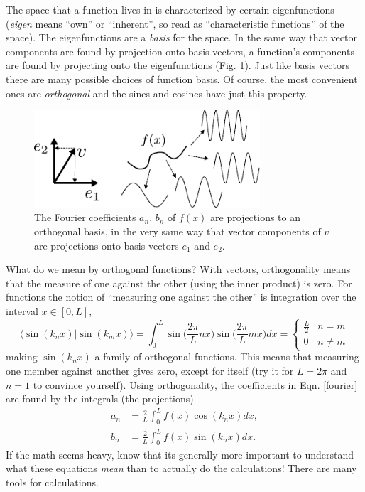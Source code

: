\documentclass[12pt]{article}
\begin{document}
The space that a function lives in is characterized by certain eigenfunctions (\textit{eigen} means ``own'' or ``inherent'', so read as ``characteristic functions'' of the space). The eigenfunctions are a \textit{basis} for the space. In the same way that vector components are found by projection onto basis vectors, a function's components are found by projecting onto the eigenfunctions (Fig. \ref{proj}). Just like basis vectors there are many possible choices of function basis. Of course, the most convenient ones are \textit{orthogonal} and the sines and cosines have just this property.
\begin{figure}[h]
  \centering
  \includegraphics[width=0.75\textwidth]{Fourier/fourier_projection}
  \caption{The Fourier coefficients $a_n$, $b_n$ of $f(x)$ are projections to an orthogonal basis, in the very same way that vector components of $v$ are projections onto basis vectors $e_1$ and $e_2$.}\label{proj}
\end{figure}

What do we mean by orthogonal functions? With vectors, orthogonality means that the measure of one against the other (using the inner product) is zero. For functions the notion of ``measuring one against the other'' is integration over the interval $x\in [0,L]$,
\begin{equation}
  \langle \sin(k_nx)|\sin(k_mx)\rangle = \int_0^L \sin\Big(\frac{2\pi}{L}nx\Big)\sin\Big(\frac{2\pi}{L}mx\Big)dx = \begin{cases} \frac{L}{2} & n=m\\
    0 & n\neq m\end{cases}
\end{equation}
making $\sin(k_nx)$ a family of orthogonal functions. This means that measuring one member against another gives zero, except for itself (try it for $L = 2\pi$ and $n=1$ to convince yourself). Using orthogonality, the coefficients in Eqn. \ref{fourier} are found by the integrals (the projections)
\begin{align}
  a_n &= \frac{2}{L}\int_0^L f(x)\cos(k_nx)dx,\label{f1}\\
  b_n &= \frac{2}{L}\int_0^L f(x)\sin(k_nx)dx.\label{f2}
\end{align}
If the math seems heavy, know that its generally more important to understand what these equations \textit{mean} than to actually do the calculations! There are many tools for calculations.
\end{document}
